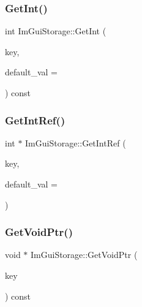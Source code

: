 \subsubsection{\texorpdfstring{Get\+Int()}{GetInt()}}
{\footnotesize\ttfamily int Im\+Gui\+Storage\+::\+Get\+Int (\begin{DoxyParamCaption}\item[{Im\+Gui\+ID}]{key,  }\item[{int}]{default\+\_\+val = {} }\end{DoxyParamCaption}) const}

\hypertarget{struct_im_gui_storage_a28673fa7839263f3066ccb8e93e748a9}{}\label{struct_im_gui_storage_a28673fa7839263f3066ccb8e93e748a9} 
\subsubsection{\texorpdfstring{Get\+Int\+Ref()}{GetIntRef()}}
{\footnotesize\ttfamily int $\ast$ Im\+Gui\+Storage\+::\+Get\+Int\+Ref (\begin{DoxyParamCaption}\item[{Im\+Gui\+ID}]{key,  }\item[{int}]{default\+\_\+val = {} }\end{DoxyParamCaption})}

\hypertarget{struct_im_gui_storage_aaf87a98ede89da09113b0189f6d878ca}{}\label{struct_im_gui_storage_aaf87a98ede89da09113b0189f6d878ca} 
\subsubsection{\texorpdfstring{Get\+Void\+Ptr()}{GetVoidPtr()}}
{\footnotesize\ttfamily void $\ast$ Im\+Gui\+Storage\+::\+Get\+Void\+Ptr (\begin{DoxyParamCaption}\item[{Im\+Gui\+ID}]{key }\end{DoxyParamCaption}) const}

\hypertarget{struct_im_gui_storage_a2b203317f3f488818e9b9f416fe35332}{}\label{struct_im_gui_storage_a2b203317f3f488818e9b9f416fe35332} 
